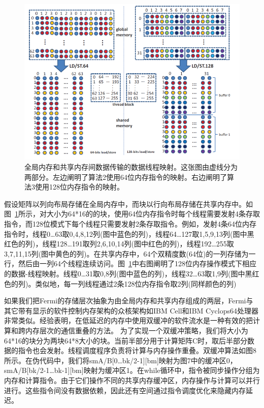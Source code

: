 \begin{flushleft}
\begin{figure}[htbp]
	\begin{center}
		\includegraphics[scale=0.8]{Img/Chap_Algorithm/DGEMMpipeline}
		\caption{全局内存和共享内存间数据传输的数据线程映射。这张图由虚线分为两部分。左边阐明了算法2使用64位内存指令的映射。右边阐明了算法3使用128位内存指令的映射。} \label{fig:DGEMMpipeline}
	\end{center}
\end{figure}

假设矩阵以列向布局存储在全局内存中，而块以行向布局存储在共享内存中。如图~\ref{fig:DGEMMpipeline}所示，对大小为64*16的的块，使用64位内存指令时每个线程需要发射4条存取指令，而128位模式下每个线程只需要发射2条存取指令。例如，发射4条64位内存指令时，线程0…63取0,4,8,12列(图中蓝色的列)，线程64…127取1,5,9,13列(图中黑红色的列)，线程128…191取列2,6,10,14列(图中红色的列)，线程192…255取3,7,11,15列(图中黄色的列)。在共享内存中，64个双精度数(64位)的一列存储为一行，然后由一列64个线程连续访问。图~\ref{fig:DGEMMpipeline}中右图阐明了128位内存操作模式下相应的数据-线程映射。线程0…31取0,8列(图中蓝色的列)，线程32…63取1,9列(图中黑红色的列)。类似地，每一列线程通过2条128位内存指令取2列(同样颜色的列)

如果我们把Fermi的存储层次抽象为由全局内存和共享内存组成的两层，Fermi与其它带有显示的软件控制内存架构的众核架构如IBM Cell和IBM Cyclops64处理器非常类似。经验表明，在低延迟的内存中使用双缓冲的软件流水是一种有效的把计算和跨内存层次的通信重叠的方法。
为了实现一个双缓冲策略，我们将大小为64*16的块分为两块64*8大小的块。当前半部分用于计算矩阵C时，取后半部分数据的指令也会发射。线程调度程序负责将计算与内存操作重叠。双缓冲算法如图8所示。在伪代码中，我们将smA/B[0…bk/2-1][bm]映射为图7中的缓冲区0，smA/B[bk/2-1…bk-1][bm]映射为缓冲区1。在while循环中，指令被同步操作分组为内存和计算指令。由于它们操作不同的共享内存缓冲区，内存操作与计算可以并行进行。这些指令间没有数据依赖，因此还有空间通过指令调度优化来隐藏内存延迟。


\end{flushleft}
